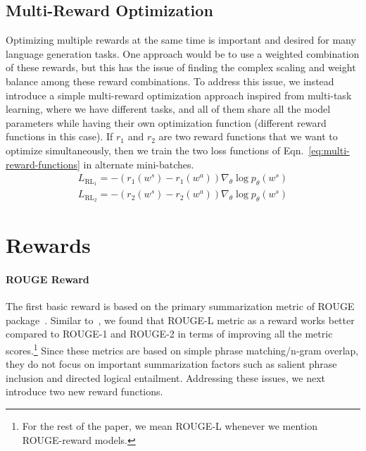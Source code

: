 \documentclass[11pt,a4paper]{article}
\begin{document}
\subsection{Multi-Reward Optimization}
\label{subsec:multi-reward-optimization}
Optimizing multiple rewards at the same time is important and desired for many language generation tasks. One approach would be to use a weighted combination of these rewards, but this has the issue of finding the complex scaling and weight balance among these reward combinations. To address this issue, we instead introduce a simple multi-reward optimization approach inspired from multi-task learning, where we have different tasks, and all of them share all the model parameters while having their own optimization function (different reward functions in this case). If $r_1$ and $r_2$ are two reward functions that we want to optimize simultaneously, then we train the two loss functions of Eqn.~\ref{eq:multi-reward-functions} in alternate mini-batches.
\vspace{-10pt}
\begin{equation}
\label{eq:multi-reward-functions}
\begin{aligned}
L_{\textrm{RL}_1} = -(r_1(w^s)-r_1(w^a)) \nabla_\theta \log p_\theta(w^s) \\
L_{\textrm{RL}_2} = -(r_2(w^s)-r_2(w^a)) \nabla_\theta \log p_\theta(w^s) 
\end{aligned}
\end{equation}

 
\section{Rewards}
\label{sec:rewards}

\paragraph{ROUGE Reward}
The first basic reward is based on the primary summarization metric of ROUGE package~\cite{lin2004rouge}. Similar to~, we found that ROUGE-L metric as a reward works better compared to ROUGE-1 and ROUGE-2 in terms of improving all the metric scores.\footnote{For the rest of the paper, we mean ROUGE-L whenever we mention ROUGE-reward models.} Since these metrics are based on 
simple phrase matching/n-gram overlap, they do not focus on important summarization factors such as salient phrase inclusion and directed logical entailment. Addressing these issues, we next introduce two new reward functions. 
\end{document}
